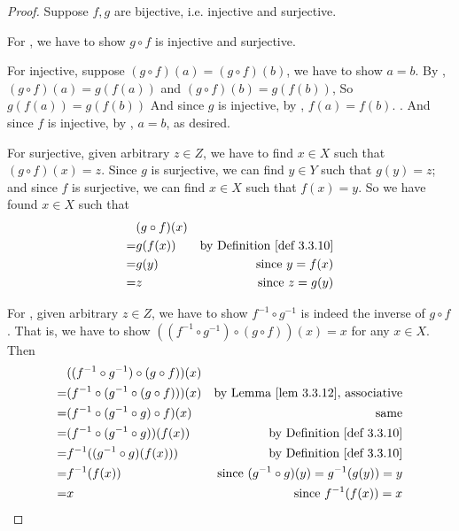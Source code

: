 \begin{proof}
Suppose \(f, g\) are bijective, i.e. injective and surjective.

For , we have to show \(g \circ f\) is injective and surjective.

For injective, suppose \((g \circ f)(a) = (g \circ f)(b)\), we have to show \(a = b\).
By , \((g \circ f)(a) = g(f(a))\) and \((g \circ f)(b) = g(f(b))\), So \(g(f(a)) = g(f(b))\) 
And since \(g\) is injective, by , \(f(a) = f(b)\). .
And since \(f\) is injective, by , \(a = b\), as desired.

For surjective, given arbitrary \(z \in Z\), we have to find \(x \in X\) such that \((g \circ f)(x) = z\).
Since \(g\) is surjective, we can find \(y \in Y\) such that \(g(y) = z\);
and since \(f\) is surjective, we can find \(x \in X\) such that \(f(x) = y\).
So we have found \(x \in X\) such that
\begin{align*}
      & (g \circ f)(x) \\
    = & g(f(x)) & \text{by \DEF{3.3.10}} \\
    = & g(y)      & \text{since \(y = f(x)\)} \\
    = & z         & \text{since \(z = g(y)\)}
\end{align*}

For , given arbitrary \(z \in Z\), we have to show \(f^{-1} \circ g^{-1}\) is indeed the inverse of \(g \circ f\).
That is, we have to show \(((f^{-1} \circ g^{-1}) \circ (g \circ f))(x) = x\) for any \(x \in X\).
Then
\begin{align*}
      & ((f^{-1} \circ g^{-1}) \circ (g \circ f))(x) \\
    = & (f^{-1} \circ (g^{-1} \circ (g \circ f)))(x) & \text{by \LEM{3.3.12}, associative} \\
    = & (f^{-1} \circ (g^{-1} \circ g) \circ f)(x) & \text{same} \\
    = & (f^{-1} \circ (g^{-1} \circ g))(f(x)) & \text{by \DEF{3.3.10}} \\
    = & f^{-1}((g^{-1} \circ g)(f(x))) & \text{by \DEF{3.3.10}} \\
    = & f^{-1}(f(x)) & \text{since \((g^{-1} \circ g)(y) = g^{-1}(g(y)) = y\)} \\
    = & x & \text{since \(f^{-1}(f(x)) = x\)}
\end{align*}
\end{proof}

